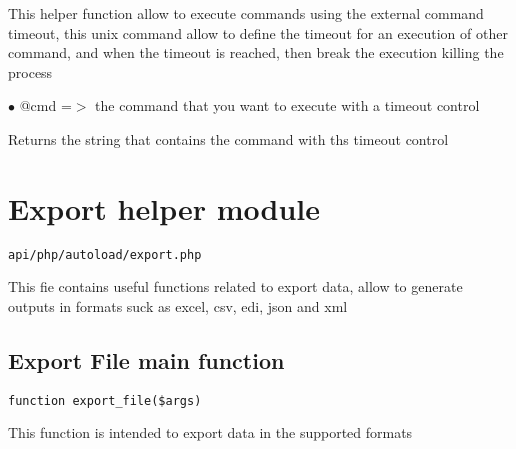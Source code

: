 \documentclass[a4paper]{book}
\begin{document}
This helper function allow to execute commands using the external
command timeout, this unix command allow to define the timeout for
an execution of other command, and when the timeout is reached, then
break the execution killing the process

\begin{compactitem}
\item[\color{myblue}$\bullet$] @cmd =$>$ the command that you want to execute with a timeout control
\end{compactitem}

Returns the string that contains the command with ths timeout control

\hypertarget{toc121}{}
\section{Export helper module}

\begin{lstlisting}
api/php/autoload/export.php
\end{lstlisting}

This fie contains useful functions related to export data, allow to generate outputs in formats
suck as excel, csv, edi, json and xml

\hypertarget{toc122}{}
\subsection{Export File main function}

\begin{lstlisting}
function export_file($args)
\end{lstlisting}

This function is intended to export data in the supported formats
\end{document}
